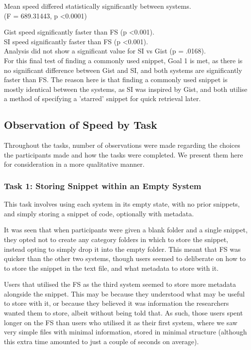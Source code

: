 Mean speed differed statistically significantly between systems. \\
(F = 689.31443, p \textless 0.0001)

Gist speed significantly faster than FS (p \textless  0.001). \\
SI speed significantly faster than FS (p \textless  0.001). \\
Analysis did not show a significant value for SI vs Gist (p = .0168). \\

For this final test of finding a commonly used snippet, Goal 1 is met, as there is no significant difference between Gist and SI, and both systems are significantly faster than FS.
The reason here is that finding a commonly used snippet is mostly identical between the systems, as SI was inspired by Gist, and both utilise a method of specifying a 'starred' snippet for quick retrieval later.


\subsection{Observation of Speed by Task}
Throughout the tasks, number of observations were made regarding the choices the participants made and how the tasks were completed. 
We present them here for consideration in a more qualitative manner.

\subsubsection{Task 1: Storing Snippet within an Empty System}
This task involves using each system in its empty state, with no prior snippets, and simply storing a snippet of code, optionally with metadata.

It was seen that when participants were given a blank folder and a single snippet, they opted not to create any category folders in which to store the snippet, instead opting to simply drop it into the empty folder. 
This meant that FS was quicker than the other two systems, though users seemed to deliberate on how to to store the snippet in the text file, and what metadata to store with it.

Users that utilised the FS as the third system seemed to store more metadata alongside the snippet. 
This may be because they understood what may be useful to store with it, or because they believed it was information the researchers wanted them to store, albeit without being told that.
As such, those users spent longer on the FS than users who utilised it as their first system, where we saw very simple files with minimal information, stored in minimal structure (although this extra time amounted to just a couple of seconds on average).

